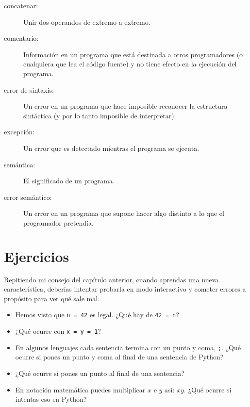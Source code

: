 \documentclass[10pt]{book}
\begin{document}
\begin{description}
\item[concatenar:]  Unir dos operandos de extremo a extremo.

\item[comentario:]  Información en un programa que está destinada a otros
programadores (o cualquiera que lea el código fuente) y no tiene efecto en la
ejecución del programa.

\item[error de sintaxis:]  Un error en un programa que hace imposible reconocer
la estructura sintáctica (y por lo tanto imposible de interpretar).

\item[excepción:]  Un error que es detectado mientras el programa se ejecuta.

\item[semántica:]  El significado de un programa.

\item[error semántico:]   Un error en un programa que supone hacer algo
distinto a lo que el programador pretendía.

\end{description}


\section{Ejercicios}

\begin{exercise}

Repitiendo mi consejo del capítulo anterior, cuando aprendas
una nueva característica, deberías intentar probarla en modo interactivo y cometer
errores a propósito para ver qué sale mal.

\begin{itemize}

\item Hemos visto que {\tt n = 42} es legal.  ¿Qué hay de {\tt 42 = n}?

\item ¿Qué ocurre con {\tt x = y = 1}?

\item En algunos lenguajes cada sentencia termina con un punto y coma, {\tt ;}.
¿Qué ocurre si pones un punto y coma al final de una sentencia de Python?

\item ¿Qué ocurre si pones un punto al final de una sentencia?

\item En notación matemática puedes multiplicar $x$ e $y$ así: $x y$.
¿Qué ocurre si intentas eso en Python?

\end{itemize}

\end{exercise}
\end{document}
